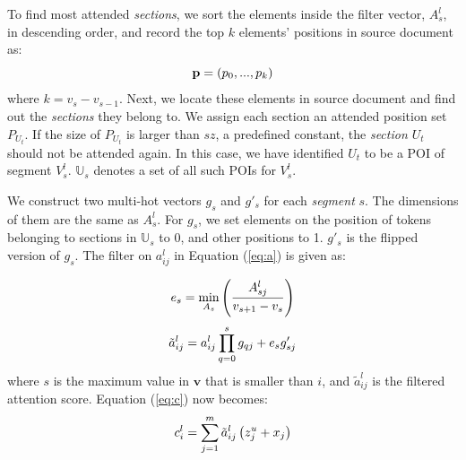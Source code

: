 To find most attended \textit{sections}, 
we sort the elements inside the filter vector, 
$A_{s}^{l}$, in descending order, 
and record the top $k$ elements' positions in 
source document as: 
\begin{equation}
\small
    \mathbf{p}=(p_{0},...,p_{k})
\end{equation}
where $k = v_{s} - v_{s-1}$.
Next, we locate these elements in source document and 
find out the \textit{sections} they belong to. 
We assign each section an attended position set $P_{U_{t}}$. 
If the size of $P_{U_{t}}$ is larger than
$sz$, a predefined constant,
the \textit{section $U_{t}$} should not be attended again. 
In this case, we have identified $U_{t}$ to be a POI of segment $V_{s}^{l}$.
$\mathbb{U}_{s}$ denotes a set of all such POIs for $V_s^l$.

We construct two multi-hot vectors $g_{s}$ and $g'_{s}$ for each \textit{segment} $s$.
The dimensions of them are the
same as $A_{s}^{l}$. For $g_{s}$, we set elements on the position of tokens
belonging to sections in $\mathbb{U}_{s}$ to 0, and other
positions to 1. $g'_{s}$ is the flipped version of $g_{s}$. 
The filter on $a_{ij}^{l}$ in Equation (\ref{eq:a}) is given as:

\begin{equation}
\small
    e_{s} = \min \limits_{A_{s}}\left(\frac{A_{sj}^{l}}{v_{s+1}-v_{s}}\right)
\end{equation}
\begin{equation}
\small
    \tilde{a}_{ij}^{l} = a_{ij}^{l}\prod_{q=0}^{s}g_{qj} + e_{s}g_{sj}'
\end{equation}
where $s$ is the maximum value in 
$\mathbf{v}$ that is smaller than $i$, and $\tilde{a}_{ij}^l$ is the filtered
attention score.  
Equation (\ref{eq:c}) now becomes:
\begin{equation}
\small
    c _ { i } ^ { l } = \sum _ { j = 1 } ^ { m } \tilde{a}_{ij}^{l} \left( z _ { j } ^ { u } + x_j \right)
\end{equation}

